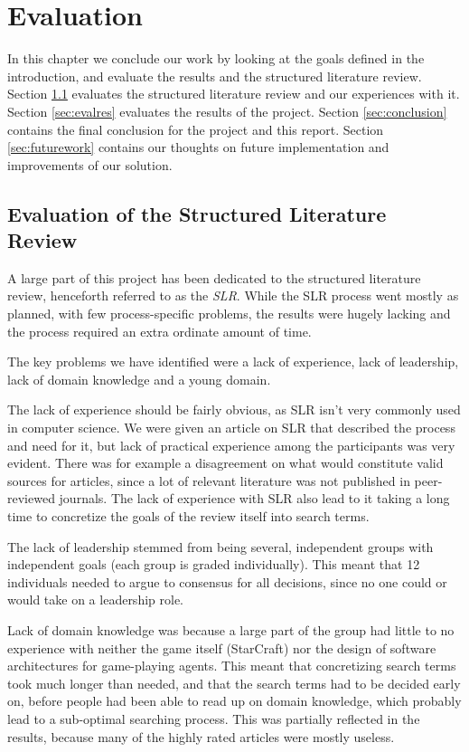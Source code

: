
\chapter{Evaluation}
In this chapter we conclude our work by looking at the goals defined in the
introduction, and evaluate the results and the structured literature
review.
Section \ref{sec:evalslr} evaluates the structured literature review and our experiences with it.
Section \ref{sec:evalres} evaluates the results of the project.
Section \ref{sec:conclusion} contains the final conclusion for the project and this report. 
Section \ref{sec:futurework} contains our thoughts on future
implementation and improvements of our solution.

\section{Evaluation of the Structured Literature Review}
\label{sec:evalslr}
A large part of this project has been dedicated to the structured literature
review, henceforth referred to as the \textit{SLR}. While the SLR process went
mostly as planned, with few process-specific problems, the results were hugely
lacking and the process required an extra ordinate amount of time.

The key problems we have identified were a lack of experience, lack of
leadership, lack of domain knowledge and a young domain.

The lack of experience should be fairly obvious, as SLR isn't very commonly
used in computer science. We were given an article on SLR that described the
process and need for it, but lack of practical experience among the
participants was very evident. There was for example a disagreement on what
would constitute valid sources for articles, since a lot of relevant literature
was not published in peer-reviewed journals. The lack of
experience with SLR also lead to it taking a long time to concretize the goals
of the review itself into search terms.

The lack of leadership stemmed from being several, independent groups with
independent goals (each group is graded individually). This meant that 12
individuals needed to argue to consensus for all decisions, since no one could
or would take on a leadership role.

Lack of domain knowledge was because a large part of the group had little to no
experience with neither the game itself (StarCraft) nor the design of software
architectures for game-playing agents. This meant that concretizing search
terms took much longer than needed, and that the search terms had to be
decided early on, before people had been able to read up on domain knowledge,
which probably lead to a sub-optimal searching process. This was partially
reflected in the results, because many of the highly rated articles were mostly
useless.

